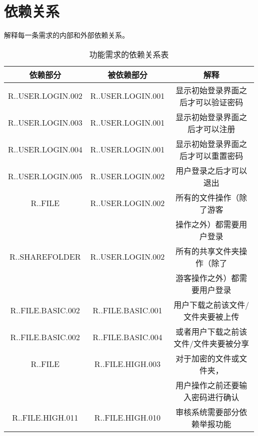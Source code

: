 \chapter{依赖关系}
解释每一条需求的内部和外部依赖关系。

\begin{table}[htbp]
\centering
\caption{功能需求的依赖关系表} \label{tab:simpletable}
\begin{tabular}{|c|c|c|}
    \hline
    依赖部分 & 被依赖部分 & 解释  \\
    \hline
    R..USER.LOGIN.002 & R..USER.LOGIN.001 & 显示初始登录界面之后才可以验证密码 \\
    \hline
    R..USER.LOGIN.003 & R..USER.LOGIN.001 & 显示初始登录界面之后才可以注册 \\
    \hline
    R..USER.LOGIN.004 & R..USER.LOGIN.001 & 显示初始登录界面之后才可以重置密码 \\
    \hline
    R..USER.LOGIN.005 & R..USER.LOGIN.002 & 用户登录之后才可以退出 \\
    \hline
    R..FILE & R..USER.LOGIN.002 & 所有的文件操作（除了游客\\ &  &操作之外）都需要用户登录 \\ 
    \hline
    R..SHAREFOLDER & R..USER.LOGIN.002 & 所有的共享文件夹操作（除了\\ &  &游客操作之外）都需要用户登录\\
    \hline
    R..FILE.BASIC.002 & R..FILE.BASIC.001 & 用户下载之前该文件/文件夹要被上传 \\
    \hline
    R..FILE.BASIC.002 & R..FILE.BASIC.004 & 或者用户下载之前该文件/文件夹要被分享 \\
    \hline
    R..FILE & R..FILE.HIGH.003 & 对于加密的文件或文件夹，\\ &  & 用户操作之前还要输入密码进行确认\\
    \hline
    R..FILE.HIGH.011 & R..FILE.HIGH.010 & 审核系统需要部分依赖举报功能 \\
    \hline
    
\end{tabular}
\end{table} 


